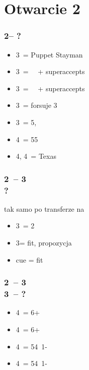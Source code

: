 \documentclass[12pt, a4paper]{report}
\begin{document}
\section*{\colorbox{blue!30}{Otwarcie 2\ntx}}
 {

    \subsubsection*{2\nt -- ?}
    \begin{itemize}
        \item 3\clubs\ = Puppet Stayman
        \item 3\diams\ = \then\ \hearts\ + superaccepts
        \item 3\hearts\ = \then\ \spades\ + superaccepts
        \item 3\spades\ = forsuje 3\nt \imp
        \item 3\nt\ = 5\hearts, \nf \imp
        \item 4\clubs\ = 55\major
        \item 4\diams, 4\hearts\ = Texas
    \end{itemize}

    \subsubsection*{2\ntx\ -- 3\diams \\ ?}
    tak samo po transferze na \spades
    \begin{itemize}
        \item 3\hearts\ = 2\hearts
        \item 3\nt = fit, propozycja
        \item cue = fit
    \end{itemize}

    \subsubsection*{2\ntx\ -- 3\spades \\ 3\nt\ -- ?}
    \begin{itemize}
        \item 4\clubs\ = 6+\clubs
        \item 4\diams\ = 6+\diams
        \item 4\hearts\ = 54\minor\ 1-\hearts
        \item 4\spades\ = 54\minor\ 1-\spades
    \end{itemize}

}
\end{document}
